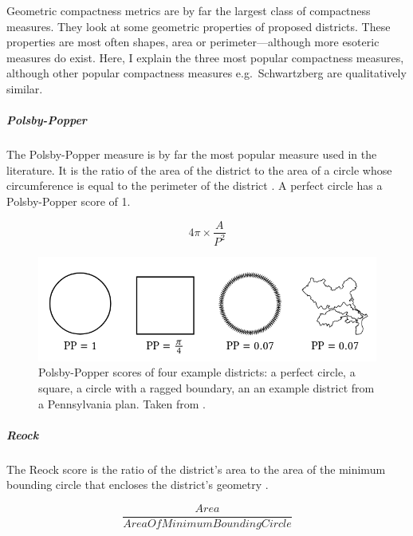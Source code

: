 \documentclass[]{article}
\let\oldsubparagraph\subparagraph
\renewcommand{\subparagraph}[1]{\oldsubparagraph{#1}\mbox{}}
\begin{document}
Geometric compactness metrics are by far the largest class of
compactness measures. They look at some geometric properties of proposed
districts. These properties are most often shapes, area or
perimeter---although more esoteric measures do exist. Here, I explain
the three most popular compactness measures, although other popular
compactness measures e.g.~Schwartzberg are qualitatively similar.

\hypertarget{polsby-popper}{%
\subparagraph{Polsby-Popper}\label{polsby-popper}}

The Polsby-Popper measure is by far the most popular measure used in the
literature. It is the ratio of the area of the district to the area of a
circle whose circumference is equal to the perimeter of the district
\citep{pp1991}. A perfect circle has a Polsby-Popper score of 1.

\[4\pi \times \frac{A}{P^2}\]

\begin{figure}
\centering
\includegraphics{img/pp_example.png}
\caption{Polsby-Popper scores of four example districts: a perfect
circle, a square, a circle with a ragged boundary, an an example
district from a Pennsylvania plan. Taken from \cite{s2020}.}
\end{figure}

\hypertarget{reock}{%
\subparagraph{Reock}\label{reock}}

The Reock score is the ratio of the district's area to the area of the
minimum bounding circle that encloses the district's geometry
\citep{reock1961}.

\[\frac{Area}{AreaOfMinimumBoundingCircle}\]
\end{document}
